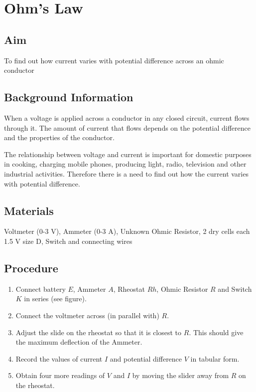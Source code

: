\chapter{Ohm's Law}

\section{Aim}
To find out how current varies with potential difference across an ohmic conductor

\section{Background Information}
When a voltage is applied across a conductor in any closed circuit, current flows through it. The amount of current that flows depends on the potential difference and the properties of the conductor.

The relationship between voltage and current is important for domestic purposes in cooking, charging mobile phones, producing light, radio, television and other industrial activities. Therefore there is a need to find out how the current varies with potential difference.


\section{Materials}
Voltmeter (0-3 V), Ammeter (0-3 A), Unknown Ohmic Resistor, 2 dry cells each 1.5 V size D, Switch and connecting wires

\section{Procedure}
\begin{enumerate}
\item Connect battery $E$, Ammeter $A$, Rheostat $Rh$, Ohmic Resistor $R$ and Switch $K$ in series (see figure).
\item Connect the voltmeter across (in parallel with) $R$.
\item Adjust the slide on the rheostat so that it is closest to $R$. This should give the maximum deflection of the Ammeter.
\item Record the values of current $I$ and potential difference $V$ in tabular form.
\item Obtain four more readings of $V$ and $I$ by moving the slider away from $R$ on the rheostat.
\end{enumerate}

